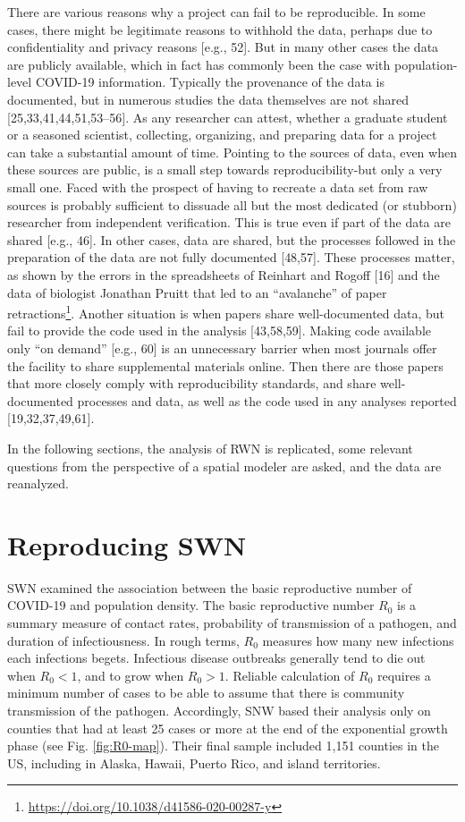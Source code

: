 \documentclass[10pt,letterpaper]{article}
\begin{document}
There are various reasons why a project can fail to be reproducible. In
some cases, there might be legitimate reasons to withhold the data,
perhaps due to confidentiality and privacy reasons {[}e.g., 52{]}. But
in many other cases the data are publicly available, which in fact has
commonly been the case with population-level COVID-19 information.
Typically the provenance of the data is documented, but in numerous
studies the data themselves are not shared {[}25,33,41,44,51,53--56{]}.
As any researcher can attest, whether a graduate student or a seasoned
scientist, collecting, organizing, and preparing data for a project can
take a substantial amount of time. Pointing to the sources of data, even
when these sources are public, is a small step towards
reproducibility-but only a very small one. Faced with the prospect of
having to recreate a data set from raw sources is probably sufficient to
dissuade all but the most dedicated (or stubborn) researcher from
independent verification. This is true even if part of the data are
shared {[}e.g., 46{]}. In other cases, data are shared, but the
processes followed in the preparation of the data are not fully
documented {[}48,57{]}. These processes matter, as shown by the errors
in the spreadsheets of Reinhart and Rogoff {[}16{]} and the data of
biologist Jonathan Pruitt that led to an ``avalanche'' of paper
retractions\footnote{\url{https://doi.org/10.1038/d41586-020-00287-y}}.
Another situation is when papers share well-documented data, but fail to
provide the code used in the analysis {[}43,58,59{]}. Making code
available only ``on demand'' {[}e.g., 60{]} is an unnecessary barrier
when most journals offer the facility to share supplemental materials
online. Then there are those papers that more closely comply with
reproducibility standards, and share well-documented processes and data,
as well as the code used in any analyses reported {[}19,32,37,49,61{]}.

In the following sections, the analysis of RWN is replicated, some
relevant questions from the perspective of a spatial modeler are asked,
and the data are reanalyzed.

\hypertarget{reproducing-swn}{%
\section{Reproducing SWN}\label{reproducing-swn}}

SWN examined the association between the basic reproductive number of
COVID-19 and population density. The basic reproductive number \(R_0\)
is a summary measure of contact rates, probability of transmission of a
pathogen, and duration of infectiousness. In rough terms, \(R_0\)
measures how many new infections each infections begets. Infectious
disease outbreaks generally tend to die out when \(R_0<1\), and to grow
when \(R_0>1\). Reliable calculation of \(R_0\) requires a minimum
number of cases to be able to assume that there is community
transmission of the pathogen. Accordingly, SNW based their analysis only
on counties that had at least 25 cases or more at the end of the
exponential growth phase (see Fig. \ref{fig:R0-map}). Their final sample
included 1,151 counties in the US, including in Alaska, Hawaii, Puerto
Rico, and island territories.
\end{document}
